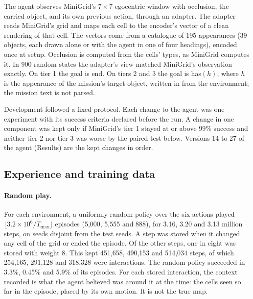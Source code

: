 \documentclass{article}
\newcommand{\cond}[1]{\textsf{#1}}
\begin{document}
The agent observes MiniGrid's $7\times7$ egocentric window with occlusion, the carried object, and its own previous action, through an adapter. The adapter reads MiniGrid's grid and maps each cell to the encoder's vector of a clean rendering of that cell. The vectors come from a catalogue of 195 appearances (39 objects, each drawn alone or with the agent in one of four headings), encoded once at setup. Occlusion is computed from the cells' types, as MiniGrid computes it. In 900 random states the adapter's view matched MiniGrid's observation exactly. On tier 1 the goal is \cond{end}. On tiers 2 and 3 the goal is \cond{has}$(h)$, where $h$ is the appearance of the mission's target object, written in from the environment; the mission text is not parsed.

Development followed a fixed protocol. Each change to the agent was one experiment with its success criteria declared before the run. A change in one component was kept only if MiniGrid's tier 1 stayed at or above 99\% success and neither tier 2 nor tier 3 was worse by the paired test below. Versions 14 to 27 of the agent (Results) are the kept changes in order.

\subsection{Experience and training data}

\paragraph{Random play.} For each environment, a uniformly random policy over the six actions played $\lfloor 3.2\times10^6/T_{\max}\rfloor$ episodes (5,000, 5,555 and 888), for 3.16, 3.20 and 3.13 million steps, on seeds disjoint from the test seeds. A step was stored when it changed any cell of the grid or ended the episode. Of the other steps, one in eight was stored with weight 8. This kept 451,658, 490,153 and 514,034 steps, of which 254,165, 291,128 and 318,328 were interactions. The random policy succeeded in 3.3\%, 0.45\% and 5.9\% of its episodes. For each stored interaction, the context recorded is what the agent believed was around it at the time: the cells seen so far in the episode, placed by its own motion. It is not the true map.
\end{document}
